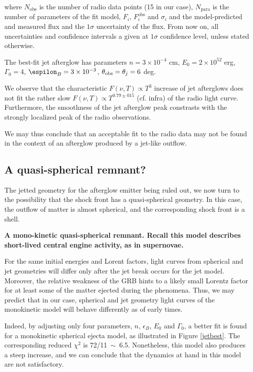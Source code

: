 where $N_\text{obs}$ is the number of radio data points (15 in our case), $N_\text{para}$ is the number of parameters of the fit model, $F_i$, $F_i^\text{obs}$ and $\sigma_i$ and the model-predicted and measured flux and the $1\sigma$ uncertainty of the flux. From now on, all uncertainties and confidence intervals a given at $1\sigma$ confidence level, unless stated otherwise.

The best-fit jet afterglow has parameters $n = 3 \times 10^{-4}$ cm, $E_0 = 2 \times 10^52$ erg, $\Gamma_0 = 4$, $\espilon_B = 3 \times 10^{-3}$, $\theta_{\mathrm{obs}} = \theta_j = 6$ deg.

We observe that the characteristic $F(\nu, T) \propto T^3$ increase of jet afterglows does not fit the rather slow $F(\nu, T) \propto T^{0.79\pm015}$ (cf. infra) of the radio light curve. Furthermore, the smoothness of the jet afterglow peak constrasts with the strongly localized peak of the radio observations.

We may thus conclude that an acceptable fit to the radio data may not be found in the context of an afterglow produced by a jet-like outflow.


\subsection{A quasi-spherical remnant?}
\label{QSR}
The jetted geometry for the afterglow emitter being ruled out, we now turn to the possibility that the shock front has a quasi-spherical geometry. In this case, the outflow of matter is almost spherical, and the corresponding shock front is a shell.

\bf{A mono-kinetic quasi-spherical remnant. }Recall this model describes short-lived central engine activity, as in supernovae.

For the same initial energies and Lorent factors, light curves from spherical and jet geometries will differ only after the jet break occurs for the jet model. Moreover, the relative weakness of the GRB hints to a likely small Lorentz factor for at least some of the matter ejected during the phenomena. Thus, we may predict that in our case, spherical and jet geometry light curves of the monokinetic model will behave differently as of early times.

Indeed, by adjusting only four parameters, $n$, $\epsilon_B$, $E_0$ and $\Gamma_0$, a better fit is found for a monokinetic spherical ejecta model, as illustrated in Figure \ref{jetbest}. The corresponding reduced $\chi^2$ is 72/11~$\sim$~6.5. Nonetheless, this model also produces a steep increase, and we can conclude that the dynamics at hand in this model are not satisfactory.

